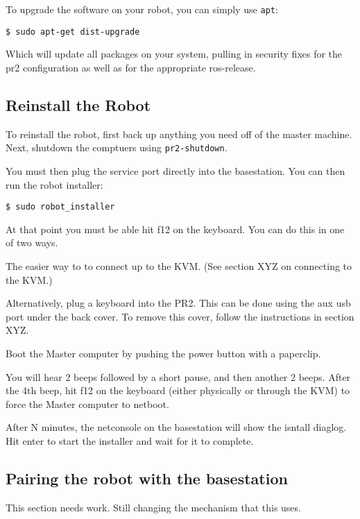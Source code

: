 To upgrade the software on your robot, you can simply use \texttt{apt}:

\begin{verbatim}
$ sudo apt-get dist-upgrade
\end{verbatim}

Which will update all packages on your system, pulling in security fixes for
the pr2 configuration as well as for the appropriate ros-release.


\subsection{Reinstall the Robot}

To reinstall the robot, first back up anything you need off of the
master machine.  Next, shutdown the comptuers using
\texttt{pr2-shutdown}.

You must then plug the service port directly into the basestation.
You can then run the robot installer:

\begin{verbatim}
$ sudo robot_installer
\end{verbatim}

At that point you must be able hit f12 on the keyboard.  You can do this in one of two ways.

The easier way to to connect up to the KVM.  (See section XYZ on connecting to the KVM.)

Alternatively, plug a keyboard into the PR2.  This can be done using
the aux usb port under the back cover.  To remove this cover, follow
the instructions in section XYZ.

Boot the Master computer by pushing the power button with a paperclip.

You will hear 2 beeps followed by a short pause, and then another 2
beeps.  After the 4th beep, hit f12 on the keyboard (either physically
or through the KVM) to force the Master computer to netboot.

After N minutes, the netconsole on the basestation will show the
isntall diaglog.  Hit enter to start the installer and wait for it to
complete.

\subsection{Pairing the robot with the basestation}

This section needs work.  Still changing the mechanism that this uses.



